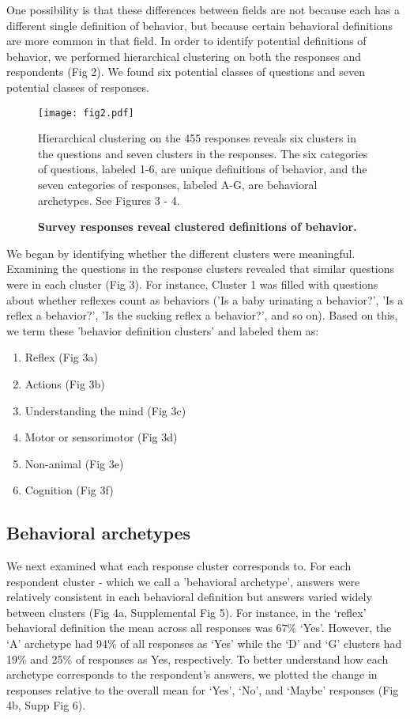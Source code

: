 \documentclass[a4paper, 11pt]{article}
\begin{document}
One possibility is that these differences between fields are not because each has a different single definition of behavior, but because certain behavioral definitions are more common in that field. In order to identify potential definitions of behavior, we performed hierarchical clustering on both the responses and respondents (Fig 2). We found six potential classes of questions and seven potential classes of responses. 

\begin{figure}
\centerline{\texttt{[image: fig2.pdf]}}
\caption{\textbf{Survey responses reveal clustered definitions of behavior.}} Hierarchical clustering on the 455 responses reveals six clusters in the questions and seven clusters in the responses. The six categories of questions, labeled 1-6, are unique definitions of behavior, and the seven categories of responses, labeled A-G, are behavioral archetypes. See Figures 3 - 4.
\end{figure}

We began by identifying whether the different clusters were meaningful. Examining the questions in the response clusters revealed that similar questions were in each cluster (Fig 3). For instance, Cluster 1 was filled with questions about whether reflexes count as behaviors ('Is a baby urinating a behavior?', 'Is a reflex a behavior?', 'Is the sucking reflex a behavior?', and so on). Based on this, we term these 'behavior definition clusters' and labeled them as:

\begin{enumerate}
 \item Reflex (Fig 3a)
 \item Actions (Fig 3b)
 \item Understanding the mind  (Fig 3c)
 \item Motor or sensorimotor  (Fig 3d)
 \item Non-animal  (Fig 3e)
 \item Cognition  (Fig 3f)
\end{enumerate}

\subsection*{Behavioral archetypes}

We next examined what each response cluster corresponds to. For each respondent cluster - which we call a 'behavioral archetype', answers were relatively consistent in each behavioral definition but answers varied widely between clusters (Fig 4a, Supplemental Fig 5). For instance, in the `reflex' behavioral definition the mean across all responses was 67\% `Yes'. However, the `A' archetype had 94\% of all responses as `Yes' while the `D' and `G' clusters had 19\% and 25\% of responses as Yes, respectively. To better understand how each archetype corresponds to the respondent's answers, we plotted the change in responses relative to the overall mean for `Yes', `No', and `Maybe' responses (Fig 4b, Supp Fig 6).
\end{document}
